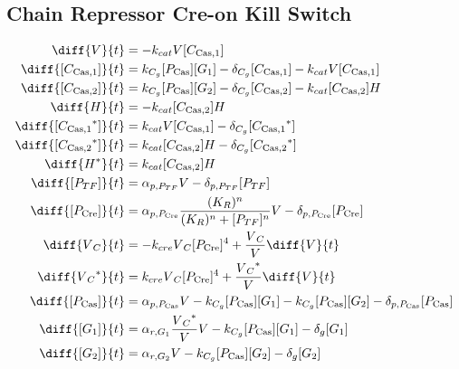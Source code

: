 \subsection{Chain Repressor Cre-on Kill Switch}
\label{s:Chain_Repressor_Cre_on_Kill_Switch}

\begin{align}
\diff{\vectorGen{}}{t} & = - \casCutRate{{}}\vectorGen{}\conc{\cplx{\cas}{1}}\\
\diff{\conc{\cplx{\cas}{1}}}{t} & =  \gRnaBind{}\conc{\proSp{\cas{}}}\conc{\gRna{1}} - \casCompDegradeRate{}\conc{\cplx{\cas}{1}} - \casCutRate{{}}\vectorGen{}\conc{\cplx{\cas}{1}}\\
\diff{\conc{\cplx{\cas}{2}}}{t} & =  \gRnaBind{}\conc{\proSp{\cas{}}}\conc{\gRna{2}} - \casCompDegradeRate{}\conc{\cplx{\cas}{2}} - \casCutRate{{}}\conc{\cplx{\cas}{2}}\hostGen{}\\
\diff{\hostGen{}}{t} & = - \casCutRate{{}}\conc{\cplx{\cas}{2}}\hostGen{}\\
\diff{\conc{\bound{\cplx{\cas}{1}}}}{t} & =  \casCutRate{{}}\vectorGen{}\conc{\cplx{\cas}{1}} - \casCompDegradeRate{}\conc{\bound{\cplx{\cas}{1}}}\\
\diff{\conc{\bound{\cplx{\cas}{2}}}}{t} & =  \casCutRate{{}}\conc{\cplx{\cas}{2}}\hostGen{} - \casCompDegradeRate{}\conc{\bound{\cplx{\cas}{2}}}\\
\diff{\edited{\hostGen{}}}{t} & =  \casCutRate{{}}\conc{\cplx{\cas}{2}}\hostGen{}\\
\diff{\conc{\proSp{TF}}}{t} & =  \txtlRate{\proSp{TF}}\vectorGen{} - \proDegradeRate{\proSp{TF}}\conc{\proSp{TF}}\\
\diff{\conc{\proSp{\cre{}}}}{t} & =  \txtlRate{\proSp{\cre{}}}\frac{(K_R)^n}{(K_R)^n + \conc{\proSp{TF}}^n}\vectorGen{} - \proDegradeRate{\proSp{\cre{}}}\conc{\proSp{\cre{}}}\\
\diff{\vectorGen{}_C}{t} & = - \creCutRate{} \vectorGen{}_C \conc{\proSp{\cre{}}}^4 + \frac{\vectorGen{}_C}{\vectorGen{}} \diff{\vectorGen{}}{t}\\
\diff{\edited{\vectorGen{}_C}}{t} & =  \creCutRate{} \vectorGen{}_C \conc{\proSp{\cre{}}}^4 + \frac{\edited{\vectorGen{}_C}}{\vectorGen{}} \diff{\vectorGen{}}{t}\\
\diff{\conc{\proSp{\cas{}}}}{t} & =  \txtlRate{\proSp{\cas{}}}\vectorGen{} - \gRnaBind{}\conc{\proSp{\cas{}}}\conc{\gRna{1}} - \gRnaBind{}\conc{\proSp{\cas{}}}\conc{\gRna{2}} - \proDegradeRate{\proSp{\cas{}}}\conc{\proSp{\cas{}}}\\
\diff{\conc{\gRna{1}}}{t} & =  \txRate{\gRna{1}}\frac{\edited{\vectorGen{}_C}}{\vectorGen{}}\vectorGen{} - \gRnaBind{}\conc{\proSp{\cas{}}}\conc{\gRna{1}} - \rnaDegradeRate{}\conc{\gRna{1}}\\
\diff{\conc{\gRna{2}}}{t} & =  \txRate{\gRna{2}}\vectorGen{} - \gRnaBind{}\conc{\proSp{\cas{}}}\conc{\gRna{2}} - \rnaDegradeRate{}\conc{\gRna{2}}
\end{align}

